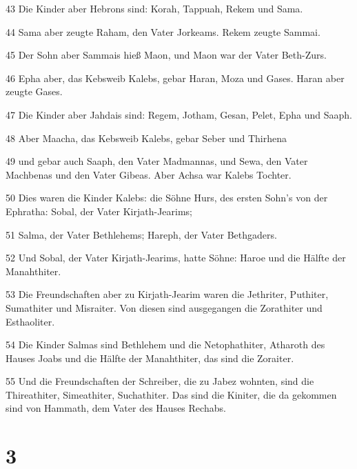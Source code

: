 \par 43 Die Kinder aber Hebrons sind: Korah, Tappuah, Rekem und Sama.
\par 44 Sama aber zeugte Raham, den Vater Jorkeams. Rekem zeugte Sammai.
\par 45 Der Sohn aber Sammais hieß Maon, und Maon war der Vater Beth-Zurs.
\par 46 Epha aber, das Kebsweib Kalebs, gebar Haran, Moza und Gases. Haran aber zeugte Gases.
\par 47 Die Kinder aber Jahdais sind: Regem, Jotham, Gesan, Pelet, Epha und Saaph.
\par 48 Aber Maacha, das Kebsweib Kalebs, gebar Seber und Thirhena
\par 49 und gebar auch Saaph, den Vater Madmannas, und Sewa, den Vater Machbenas und den Vater Gibeas. Aber Achsa war Kalebs Tochter.
\par 50 Dies waren die Kinder Kalebs: die Söhne Hurs, des ersten Sohn's von der Ephratha: Sobal, der Vater Kirjath-Jearims;
\par 51 Salma, der Vater Bethlehems; Hareph, der Vater Bethgaders.
\par 52 Und Sobal, der Vater Kirjath-Jearims, hatte Söhne: Haroe und die Hälfte der Manahthiter.
\par 53 Die Freundschaften aber zu Kirjath-Jearim waren die Jethriter, Puthiter, Sumathiter und Misraiter. Von diesen sind ausgegangen die Zorathiter und Esthaoliter.
\par 54 Die Kinder Salmas sind Bethlehem und die Netophathiter, Atharoth des Hauses Joabs und die Hälfte der Manahthiter, das sind die Zoraiter.
\par 55 Und die Freundschaften der Schreiber, die zu Jabez wohnten, sind die Thireathiter, Simeathiter, Suchathiter. Das sind die Kiniter, die da gekommen sind von Hammath, dem Vater des Hauses Rechabs.

\chapter{3}

